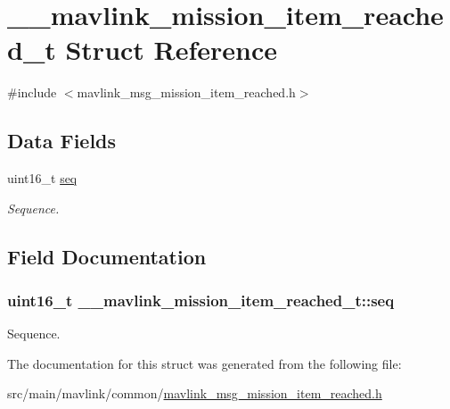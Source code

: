 \hypertarget{struct____mavlink__mission__item__reached__t}{\section{\+\_\+\+\_\+mavlink\+\_\+mission\+\_\+item\+\_\+reached\+\_\+t Struct Reference}
\label{struct____mavlink__mission__item__reached__t}
}


{\ttfamily \#include $<$mavlink\+\_\+msg\+\_\+mission\+\_\+item\+\_\+reached.\+h$>$}

\subsection*{Data Fields}
\begin{DoxyCompactItemize}
\item 
uint16\+\_\+t \hyperlink{struct____mavlink__mission__item__reached__t_acdab74a4633c0c3b3dfcfa75c9d2b234}{seq}
\begin{DoxyCompactList}\small\item\em Sequence. \end{DoxyCompactList}\end{DoxyCompactItemize}


\subsection{Field Documentation}
\hypertarget{struct____mavlink__mission__item__reached__t_acdab74a4633c0c3b3dfcfa75c9d2b234}{
\subsubsection[{seq}]{\setlength{\rightskip}{0pt plus 5cm}uint16\+\_\+t \+\_\+\+\_\+mavlink\+\_\+mission\+\_\+item\+\_\+reached\+\_\+t\+::seq}}\label{struct____mavlink__mission__item__reached__t_acdab74a4633c0c3b3dfcfa75c9d2b234}


Sequence. 



The documentation for this struct was generated from the following file\+:\begin{DoxyCompactItemize}
\item 
src/main/mavlink/common/\hyperlink{mavlink__msg__mission__item__reached_8h}{mavlink\+\_\+msg\+\_\+mission\+\_\+item\+\_\+reached.\+h}\end{DoxyCompactItemize}
